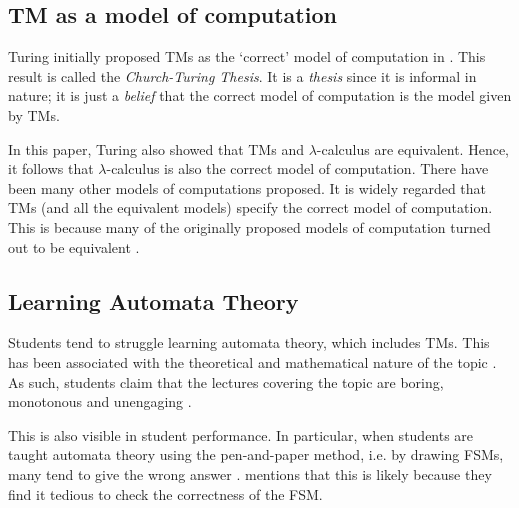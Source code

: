 \subsection{TM as a model of computation}
Turing initially proposed TMs as the `correct' model of computation in \citet{turing1936computable}. This result is called the \emph{Church-Turing Thesis}. It is a \textit{thesis} since it is informal in nature; it is just a \textit{belief} that the correct model of computation is the model given by TMs. 

In this paper, Turing also showed that TMs and $\lambda$-calculus are equivalent. Hence, it follows that $\lambda$-calculus is also the correct model of computation. There have been many other models of computations proposed. It is widely regarded that TMs (and all the equivalent models) specify the correct model of computation. This is because many of the originally proposed models of computation turned out to be equivalent \citep{copeland2004essential}.

\subsection{Learning Automata Theory}
Students tend to struggle learning automata theory, which includes TMs. This has been associated with the theoretical and mathematical nature of the topic \citep{wermelinger2005prolog}. As such, students claim that the lectures covering the topic are boring, monotonous and unengaging \citep{pillay2010learning}. 

This is also visible in student performance. In particular, when students are taught automata theory using the pen-and-paper method, i.e. by drawing FSMs, many tend to give the wrong answer \citep{rodger2006jflap}. \citet{rodger2009increasing} mentions that this is likely because they find it tedious to check the correctness of the FSM.

